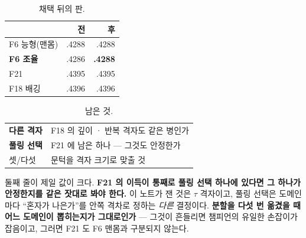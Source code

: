 \documentclass[10pt]{article}
\begin{document}


\begin{table}[t]
\centering\tsize
\caption{채택 뒤의 판.}
\begin{tabular}{lrr}
\toprule
& 전 & 후 \\
\midrule
F6 능형(맨몸) & .4288 & .4288 \\
\textbf{F6 조율} & .4286 & \textbf{.4288} \\
F21 & .4395 & .4395 \\
F18 배깅 & .4396 & .4396 \\
\bottomrule
\end{tabular}
\end{table}


\begin{table}[t]
\centering\tsize
\caption{남은 것.}
\begin{tabular}{ll}
\toprule
\textbf{다른 격자} & F18 의 깊이 · 반복 격자도 같은 병인가 \\
\textbf{풀링 선택} & F21 에 남은 하나 --- 그것도 안정한가 \\
셋/다섯 & 문턱을 격자 크기로 맞출 것 \\
\bottomrule
\end{tabular}
\end{table}

둘째 줄이 제일 값이 크다. \textbf{F21 의 이득이 통째로 풀링 선택 하나에
있다면 그 하나가 안정한지를 같은 잣대로 봐야 한다.} 이 노트가 잰 것은
$\tau$ 격자이고, 풀링 선택은 도메인마다 ``혼자가 나은가''를 안쪽 격차로
정하는 \emph{다른} 결정이다. \textbf{분할을 다섯 번 옮겼을 때 어느
도메인이 뽑히는지가 그대로인가} --- 그것이 흔들리면 챔피언의 유일한
손잡이가 잡음이고, 그러면 F21 도 F6 맨몸과 구분되지 않는다.
\end{document}
